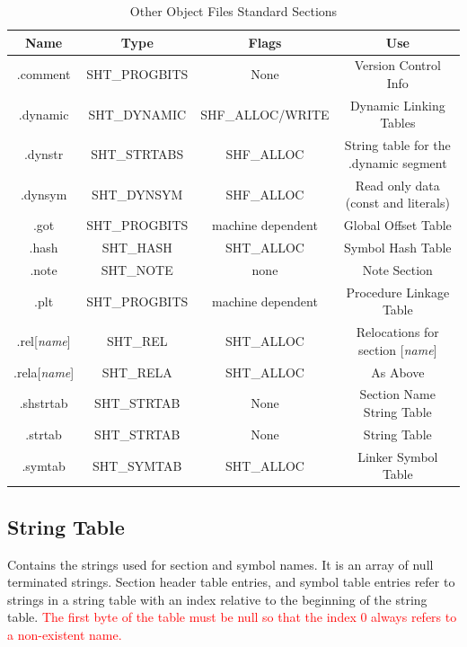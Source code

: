\documentclass[paper=a4, fontsize=11pt]{report} %
\numberwithin{equation}{section} %
\numberwithin{figure}{section} %
\numberwithin{table}{section} %
\begin{document}
\begin{table}[!htbp]
	\begin{center}
		\begin{tabular}{|c|c|c|c|}
			\hline
			\textbf{Name} & \textbf{Type} & \textbf{Flags} & \textbf{Use}\\ 
			\hline
			{\ttfamily .comment} & {\ttfamily SHT\_PROGBITS} & {\ttfamily 
				None} & Version Control Info\\ \hline
			{\ttfamily .dynamic} & {\ttfamily SHT\_DYNAMIC} & {\ttfamily 
				SHF\_ALLOC/WRITE} & Dynamic Linking Tables\\ \hline
			{\ttfamily .dynstr} & {\ttfamily SHT\_STRTABS} & {\ttfamily 
				SHF\_ALLOC} & String table for the {\ttfamily .dynamic} 
				segment\\ \hline
			{\ttfamily .dynsym} & {\ttfamily SHT\_DYNSYM} & {\ttfamily 
				SHF\_ALLOC} & Read only data (const and literals)\\ \hline
			{\ttfamily .got} & {\ttfamily SHT\_PROGBITS} & {\ttfamily 
				machine dependent} & Global Offset Table\\ \hline
			{\ttfamily .hash} & {\ttfamily SHT\_HASH} & {\ttfamily 
				SHT\_ALLOC} & Symbol Hash Table\\ \hline
			{\ttfamily .note} & {\ttfamily SHT\_NOTE} & {\ttfamily 
				none} & Note Section\\ \hline
			{\ttfamily .plt} & {\ttfamily SHT\_PROGBITS} & {\ttfamily 
				machine dependent} & Procedure Linkage Table\\ \hline
			{\ttfamily .rel[\textit{name}]} & {\ttfamily SHT\_REL} & 
			{\ttfamily SHT\_ALLOC} & Relocations for section [\textit{name}]\\ 
			\hline
			{\ttfamily .rela[\textit{name}]} & {\ttfamily SHT\_RELA} & 
			{\ttfamily SHT\_ALLOC} & As Above \\ 
			\hline
			{\ttfamily .shstrtab} & {\ttfamily SHT\_STRTAB} & {\ttfamily None} 
			& Section Name String Table\\ \hline
			{\ttfamily .strtab} & {\ttfamily SHT\_STRTAB} & {\ttfamily None} & 
			String Table\\ \hline
			{\ttfamily .symtab} & {\ttfamily SHT\_SYMTAB} & {\ttfamily 
			SHT\_ALLOC} & Linker Symbol Table\\ \hline
		\end{tabular}
		\caption{Other Object Files Standard Sections}
		\label{objfile}
	\end{center}
\end{table}
\subsection{String Table}
Contains the strings used for section and symbol names. It is an array of null 
terminated strings. Section header table entries, and symbol table entries 
refer to strings in a string table with an index relative to the beginning of 
the string table. \textcolor{red}{The first byte of the table must be null so 
that the index 0 always refers to a non-existent name.}
\end{document}
